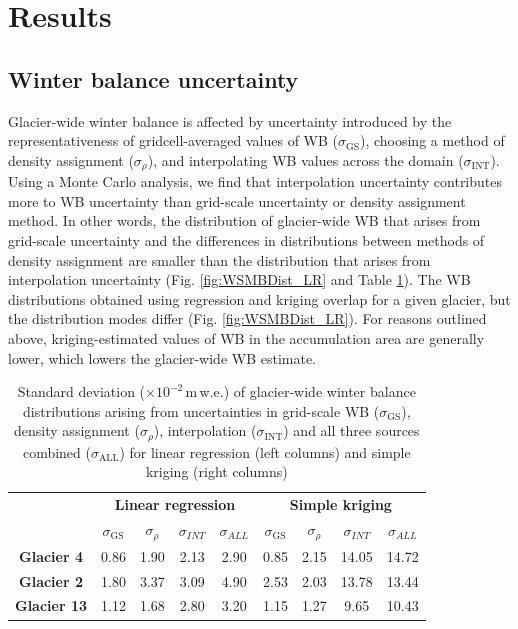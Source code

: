 \documentclass{sfuthesis}
\begin{document}
\section{Results}
\label{sec:Unc_results}

\subsection{Winter balance uncertainty}

Glacier-wide winter balance is affected by uncertainty introduced by the representativeness of gridcell-averaged values of WB ($\sigma_{\mathrm{GS}}$), choosing a method of density assignment ($\sigma_{\rho}$), and interpolating WB values across the domain ($\sigma_{\mathrm{INT}}$). Using a Monte Carlo analysis, we find that interpolation uncertainty contributes more to WB uncertainty than grid-scale uncertainty or density assignment method. In other words, the distribution of glacier-wide WB that arises from grid-scale uncertainty and the differences in distributions between methods of density assignment are smaller than the distribution that arises from interpolation uncertainty (Fig. \ref{fig:WSMBDist_LR} and Table \ref{tab:WSMBdistribution_sigma}). The WB distributions obtained using regression and kriging overlap for a given glacier, but the distribution modes differ (Fig. \ref{fig:WSMBDist_LR}). For reasons outlined above, kriging-estimated values of WB in the accumulation area are generally lower, which lowers the glacier-wide WB estimate. 

 \begin{table}[]
\centering
\caption{Standard deviation ($\times10^{-2}$\,m\,w.e.) of glacier-wide winter balance distributions arising from uncertainties in grid-scale WB ($\sigma_{\mathrm{GS}}$), density assignment ($\sigma_{\rho}$), interpolation ($\sigma_{\mathrm{INT}}$) and all three sources combined ($\sigma_{\mathrm{ALL}}$) for linear regression (left columns) and simple kriging (right columns)}
\label{tab:WSMBdistribution_sigma}
\begin{tabular}{c|cccc|cccc}
 & \multicolumn{4}{c|}{\textbf{Linear regression}} & \multicolumn{4}{c}{\textbf{Simple kriging}} \\
\textbf{} & $\sigma_{\mathrm{GS}}$ & $\sigma_{\rho}$ & $\sigma_{INT}$ & $\sigma_{ALL}$ & $\sigma_{\mathrm{GS}}$ & $\sigma_{\rho}$ & $\sigma_{INT}$ & $\sigma_{ALL}$ \\ \hline
\textbf{Glacier 4} & 0.86 & 1.90 & 2.13 & 2.90 & 0.85 & 2.15 & 14.05 & 14.72 \\
\textbf{Glacier 2} & 1.80 & 3.37 & 3.09 & 4.90 & 2.53 & 2.03 & 13.78 & 13.44 \\
\textbf{Glacier 13} & 1.12 & 1.68 & 2.80 & 3.20 & 1.15 & 1.27 & 9.65 & 10.43
\end{tabular}
\end{table}
\end{document}
